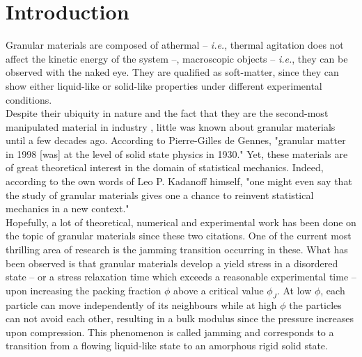 \documentclass[class=report, float=false, crop=false]{standalone}
\begin{document}
\section*{Introduction}
\label{introduction}

Granular materials are composed of athermal -- \textit{i.e.}, thermal agitation does not affect the kinetic energy of the system --, macroscopic objects -- \textit{i.e.}, they can be observed with the naked eye. \cite{duran2012sands} They are qualified as soft-matter, since they can show either liquid-like or solid-like properties under different experimental conditions.\\

Despite their ubiquity in nature and the fact that they are the second-most manipulated material in industry \cite{patrick2005slow}, little was known about granular materials until a few decades ago. According to Pierre-Gilles de Gennes, "granular matter in 1998 [was] at the level of solid state physics in 1930." \cite{de1999granular} Yet, these materials are of great theoretical interest in the domain of statistical mechanics. Indeed, according to the own words of Leo P. Kadanoff himself, "one might even say that the study of granular materials gives one a chance to reinvent statistical mechanics in a new context." \cite{kadanoff1999built}\\

Hopefully, a lot of theoretical, numerical and experimental work has been done on the topic of granular materials since these two citations. One of the current most thrilling area of research is the jamming transition occurring in these. What has been observed is that granular materials develop a yield stress in a disordered state \cite{PRE68.011306} -- or a stress relaxation time which exceeds a reasonable experimental time -- upon increasing the packing fraction $\phi$ above a critical value $\phi_J$. At low $\phi$, each particle can move independently of its neighbours while at high $\phi$ the particles can not avoid each other, resulting in a bulk modulus since the pressure increases upon compression. This phenomenon is called jamming and corresponds to a transition from a flowing liquid-like state to an amorphous rigid solid state.\\
\end{document}
